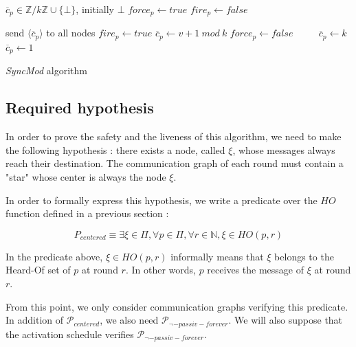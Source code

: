 \documentclass{article}
\begin{document}
\begin{algorithm}[htb]
\begin{distribalgo}[1]
\BLANK {}
	\STATE $\overline{c}_p \in \mathds{Z}/k\mathds{Z} \cup \{\bot\}$, initially $\bot$
	\STATE $force_p \leftarrow true$
	\STATE $fire_p \leftarrow false$

\ENDINDENT \BLANK

		\STATE send $\langle \overline{c}_p \rangle$ to all nodes
	\ENDINDENT
	\BLANK
			\STATE $fire_p \leftarrow true$
		\ENDIF
			\STATE $\overline{c}_p \leftarrow v+1~mod~k$
			\STATE $force_p \leftarrow false$ ~~~~
			\STATE $\overline{c}_p \leftarrow k$
		\ELSE
			\STATE $\overline{c}_p \leftarrow 1$ ~~~~
		\ENDIF
	\ENDINDENT
\ENDINDENT 
\caption{{\em SyncMod} algorithm} \label{algo:R}
\end{distribalgo}

\end{algorithm}

\subsection{Required hypothesis}

In order to prove the safety and the liveness of this algorithm, we need to make the following hypothesis :
there exists a node, called $\xi$, whose messages always reach their destination.
The communication graph of each round must contain a "star" whose center is always the node $\xi$.

In order to formally express this hypothesis, we write a predicate over the $HO$ function defined in a previous section :

$$P_{centered} \equiv \exists \xi \in \Pi, \forall p \in \Pi, \forall r \in \mathds{N}, \xi \in HO(p,r)$$

In the predicate above, $\xi \in HO(p,r)$ informally means that $\xi$ belongs to the Heard-Of set of $p$ at round $r$. In other words, $p$ receives the message of $\xi$ at round $r$.

From this point, we only consider communication graphs verifying this predicate.
In addition of $\mathcal{P}_{centered}$, we also need $\mathcal{P}_{\neg-passiv-forever}$.
We will also suppose that the activation schedule verifies $\mathcal{P}_{\neg-passiv-forever}$.
\end{document}
